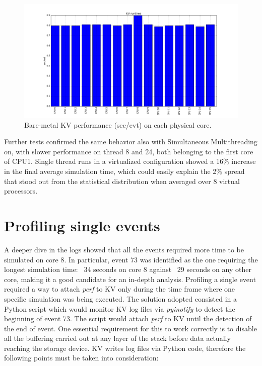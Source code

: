 \documentclass[a4paper]{jpconf}
\begin{document}
\begin{figure}[b]
\begin{center}
\includegraphics[scale=0.3]{images/kv_runtime.png}
\end{center}
\caption{\label{kv-runtime} Bare-metal KV performance (sec/evt) on each physical core. }
\end{figure}
Further tests confirmed the same behavior also with Simultaneous Multithreading 
on, with slower performance on thread 8 and 24, both belonging to the first core of 
CPU1. Single thread runs in a virtualized configuration showed a 16\%
increase in the final average simulation time, which could easily explain the 2\%
spread that stood out from the statistical distribution when averaged over 8
virtual processors. 


\section{Profiling single events}
A deeper dive in the logs showed that all the events required more time to be 
simulated on core 8. In particular, event 73 was identified as the one
requiring the longest simulation time: ~34 seconds on core 8 against ~29 seconds
on any other core, making it a good candidate for an in-depth analysis. Profiling 
a single event required a way to attach \textit{perf} to KV only during the time frame
where one specific simulation was being executed. The solution adopted consisted
in a Python script which would monitor KV log files via \textit{pyinotify} to detect
the beginning of event 73. The script would attach \textit{perf} to KV until the
detection of the end of event. One essential requirement for this to work correctly
is to disable all the buffering carried out at any layer of the stack before
data actually reaching the storage device. KV writes log files via Python code,
therefore the following points must be taken into consideration:
\end{document}
